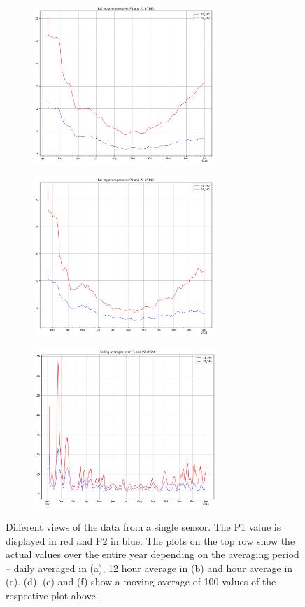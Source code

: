 \documentclass[12pt,a4paper,twoside]{scrartcl}
\numberwithin{equation}{section}
\begin{document}
\begin{figure}[H]
  \begin{subfigure}[t]{0.32\textwidth}
    \includegraphics[width=\textwidth,height=6cm]{figures/1D_140_rolling_plot_}%
    \caption{}
  \end{subfigure}
  \begin{subfigure}[t]{0.32\textwidth}
    \includegraphics[width=\textwidth,height=6cm]{figures/12H_140_rolling_plot_}%
    \caption{}
  \end{subfigure}
  \begin{subfigure}[t]{0.32\textwidth}
    \includegraphics[width=\textwidth,height=6cm]{figures/1H_140_rolling_plot_}%
    \subcaption{}
  \end{subfigure}      
  \caption[Sensor Data Plots]{Different views of the data from a single sensor. The P1 value is displayed in red and P2 in blue. The plots on the top row show the actual values over the entire year depending on the averaging period -- daily averaged in (a), 12 hour average in (b) and hour average in (c). (d), (e) and (f) show a moving average of 100 values of the respective plot above.}\label{fig:sensor-plots}
\end{figure}
\end{document}
